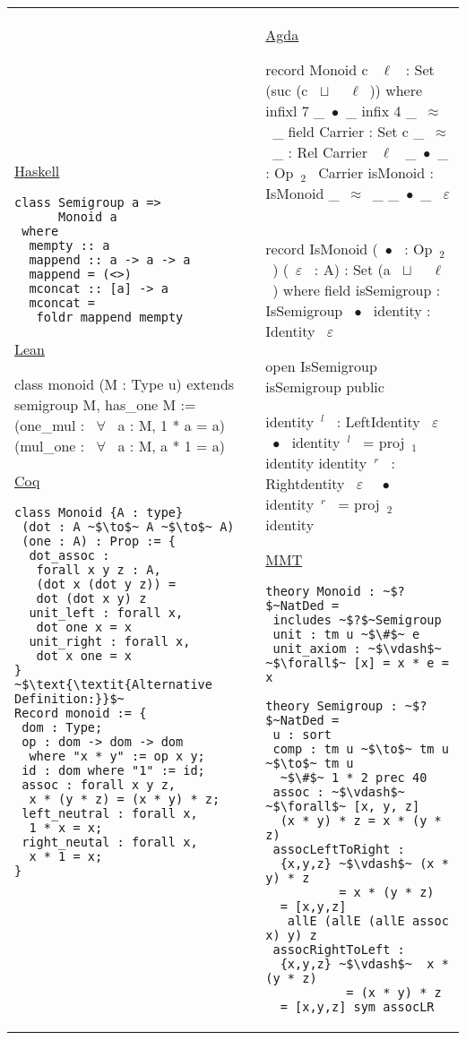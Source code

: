 \footnotesize
\begin{tabular}{p{6.3cm} p{7cm}}
\underline{Haskell}
\begin{verbatim}
class Semigroup a => 
      Monoid a 
 where 
  mempty :: a 
  mappend :: a -> a -> a 
  mappend = (<>) 
  mconcat :: [a] -> a 
  mconcat = 
   foldr mappend mempty 
\end{verbatim} 
\underline{Lean}
\begin{leancode}
class monoid (M : Type u)
 extends semigroup M, 
         has_one M :=
  (one_mul : ~$\forall$~ a : M, 
           1 * a = a) 
  (mul_one : ~$\forall$~ a : M, 
           a * 1 = a)   
\end{leancode} 
\underline{Coq}
\begin{verbatim}
class Monoid {A : type}
 (dot : A ~$\to$~ A ~$\to$~ A)
 (one : A) : Prop := {
  dot_assoc : 
   forall x y z : A, 
   (dot x (dot y z)) = 
   dot (dot x y) z
  unit_left : forall x, 
   dot one x = x 
  unit_right : forall x, 
   dot x one = x              
}
~$\text{\textit{Alternative Definition:}}$~
Record monoid := {
 dom : Type; 
 op : dom -> dom -> dom 
  where "x * y" := op x y; 
 id : dom where "1" := id; 
 assoc : forall x y z, 
  x * (y * z) = (x * y) * z; 
 left_neutral : forall x,   
  1 * x = x; 
 right_neutal : forall x,
  x * 1 = x; 
}
\end{verbatim} 
&
\underline{Agda}
\begin{agdacode}
record Monoid c ~$\ell$~ : 
   Set (suc (c ~$\sqcup$~ ~$\ell$~)) where 
 infixl 7 _~$\bullet$~_
 infix 4 _~$\approx$~_
 field 
  Carrier : Set c 
  _~$\approx$~_ : Rel Carrier ~$\ell$~ 
  _~$\bullet$~_ : Op~$_2$~ Carrier 
  isMonoid : IsMonoid _~$\approx$~_ _~$\bullet$~_ ~$\varepsilon$~ 
  
record IsMonoid (~$\bullet$~ : Op~$_2$~) (~$\varepsilon$~ : A) 
 : Set (a ~$\sqcup$~ ~$\ell$~) where 
  field 
   isSemigroup : IsSemigroup ~$\bullet$~ 
   identity : Identity ~$\varepsilon$~ 
       
   open IsSemigroup isSemigroup public 
   
   identity~$^l$~ : LeftIdentity ~$\varepsilon$~ ~$\bullet$~ 
   identity~$^l$~ = proj~$_1$~ identity 
   identity~$^r$~ : Rightdentity ~$\varepsilon$~ ~$\bullet$~ 
   identity~$^r$~ = proj~$_2$~ identity        
\end{agdacode}       
\underline{MMT}
\begin{verbatim} 
theory Monoid : ~$?$~NatDed = 
 includes ~$?$~Semigroup 
 unit : tm u ~$\#$~ e 
 unit_axiom : ~$\vdash$~ ~$\forall$~ [x] = x * e = x      
 
theory Semigroup : ~$?$~NatDed = 
 u : sort 
 comp : tm u ~$\to$~ tm u ~$\to$~ tm u 
  ~$\#$~ 1 * 2 prec 40
 assoc : ~$\vdash$~ ~$\forall$~ [x, y, z]
  (x * y) * z = x * (y * z)    
 assocLeftToRight : 
  {x,y,z} ~$\vdash$~ (x * y) * z 
          = x * (y * z) 
  = [x,y,z] 
   allE (allE (allE assoc x) y) z
 assocRightToLeft : 
  {x,y,z} ~$\vdash$~  x * (y * z) 
           = (x * y) * z 
  = [x,y,z] sym assocLR  
\end{verbatim}      
\end{tabular}  

